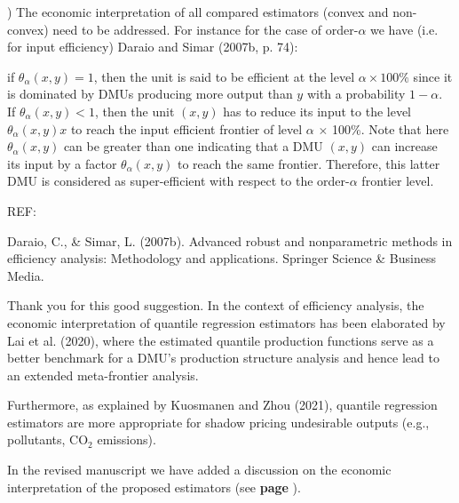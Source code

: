 \documentclass[12pt]{article}
\newcommand{\np}{\vskip 0.3cm}
\begin{document}

\np
\np
\np

\begin{sf}
{) The economic interpretation of all compared estimators (convex and non-convex) need to be addressed. For instance for the case of order-$\alpha$ we have (i.e. for input efficiency) Daraio and Simar (2007b, p. 74):\np

if $\theta_{\alpha}(x, y) = 1$, then the unit is said to be efficient at the level $\alpha \times 100\%$ since it is dominated by DMUs producing more output than $y$ with a probability $1 - \alpha$. If $\theta_{\alpha}(x, y) < 1$, then the unit $(x, y)$ has to reduce its input to the level $\theta_{\alpha}(x, y)x$ to reach the input efficient frontier of level $\alpha$ $\times$ 100\%. Note that here $\theta_{\alpha}(x, y)$ can be greater than one indicating that a DMU $(x, y)$ can increase its input by a factor $\theta_{\alpha}(x, y)$ to reach the same frontier. Therefore, this latter DMU is considered as super-efficient with respect to the order-$\alpha$ frontier level.\np

REF:

Daraio, C., \& Simar, L. (2007b). Advanced robust and nonparametric methods in efficiency analysis: Methodology and applications. Springer Science \& Business Media.}
\end{sf}
\begin{response}
Thank you for this good suggestion. In the context of efficiency analysis, the economic interpretation of quantile regression estimators has been elaborated by Lai et al. (2020), where the estimated quantile production functions serve as a better benchmark for a DMU's production structure analysis and hence lead to an extended meta-frontier analysis. \np

Furthermore, as explained by Kuosmanen and Zhou (2021), quantile regression estimators are more appropriate for shadow pricing undesirable outputs (e.g., pollutants, CO$_2$ emissions). \np

In the revised manuscript we have added a discussion on the economic interpretation of the proposed estimators (see \textbf{page }).

\end{response}

\end{document}
